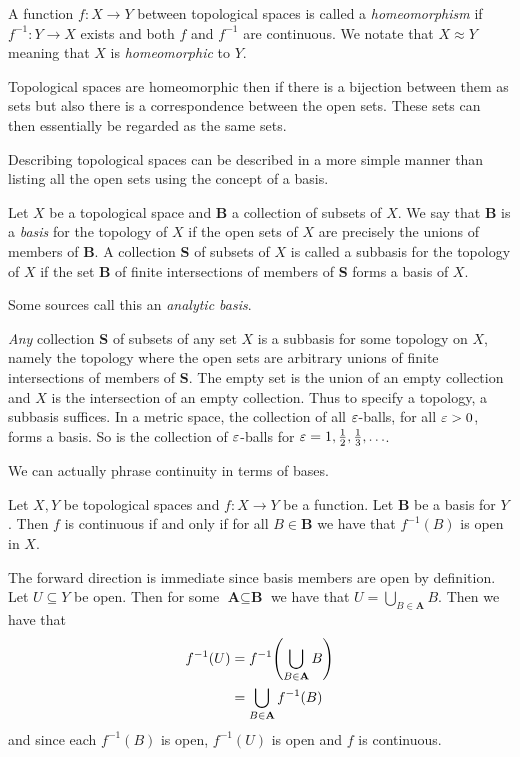 \documentclass[letterpaper, 11pt, oneside]{book}
\begin{document}
\begin{defn}
  A function $f\colon X \to Y$ between topological spaces is called a \emph{homeomorphism} if $f^{-1}\colon Y \to X$ exists and both $f$ and $f^{-1}$ are continuous.
  We notate that $X \approx Y$ meaning that $X$ is \emph{homeomorphic} to $Y$.
\end{defn}

Topological spaces are homeomorphic then if there is a bijection between them as sets but also there is a correspondence between the open sets.
These sets can then essentially be regarded as the same sets.

Describing topological spaces can be described in a more simple manner than listing all the open sets using the concept of a basis.
\begin{defn}
  Let $X$ be a topological space and \textbf{B} a collection of subsets of $X$.
  We say that \textbf{B} is a \emph{basis} for the topology of $X$ if the open sets of $X$ are precisely the unions of members of \textbf{B}.
  A collection \textbf{S} of subsets of $X$ is called a subbasis for the topology of $X$ if the set \textbf{B} of finite intersections of members of \textbf{S} forms a basis of $X$.

  Some sources call this an \emph{analytic basis}.
\end{defn}

\emph{Any} collection \textbf{S} of subsets of any set $X$ is a subbasis for some topology on $X$, namely the topology where the open sets are arbitrary unions of finite intersections of members of \textbf{S}.
The empty set is the union of an empty collection and $X$ is the intersection of an empty collection.
Thus to specify a topology, a subbasis suffices.
In a metric space, the collection of all $\varepsilon$-balls, for all $\varepsilon > 0$, forms a basis.
So is the collection of $\varepsilon$-balls for $\varepsilon = 1, \frac{1}{2}, \frac{1}{3}, \ldots$.

\clearpage

We can actually phrase continuity in terms of bases.
\begin{thrm}\label{thrm: continuity_for_bases}
  Let $X, Y$ be topological spaces and $f\colon X \to Y$ be a function.
  Let \textbf{B} be a basis for $Y$.
  Then $f$ is continuous if and only if for all $B \in \textbf{B}$ we have that $f^{-1}(B)$ is open in $X$.
\end{thrm}
\begin{pf}
  The forward direction is immediate since basis members are open by definition.
  Let $U \subseteq Y$ be open.
  Then for some $\textbf{A} \subseteq \textbf{B}$ we have that $U = \bigcup_{B \in \textbf{A}} B$.
  Then we have that
  \begin{align*}
    f^{-1}(U) &= f^{-1}\pqty{\bigcup_{B \in \textbf{A}} B} \\
              &= \bigcup_{B \in \textbf{A}} f^{-1}(B)
  \end{align*}
  and since each $f^{-1}(B)$ is open, $f^{-1}(U)$ is open and $f$ is continuous.
\end{pf}
\end{document}
